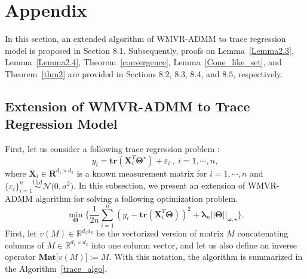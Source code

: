 \documentclass[alpha-refs]{wiley-article}
\begin{document}


\newpage
\section{Appendix}
In this section, an extended algorithm of WMVR-ADMM to trace regression model is proposed in Section 8.1.
Subsequently, proofs on Lemma~\ref{Lemma2.3}, Lemma~\ref{Lemma2.4}, Theorem~\ref{convergence}, Lemma~\ref{Cone_like_set}, and Theorem~\ref{thm2} are provided in Sections $8.2$, $8.3$, $8.4$, and $8.5$, respectively.

\subsection{Extension of WMVR-ADMM to Trace Regression Model} \label{tr_algo}
First, let us consider a following trace regression problem :
\begin{equation*}
    y_{i} = \textbf{tr}(\boldsymbol{X}^{T}_{i}\boldsymbol{\Theta^\star}) + \varepsilon_{i} \ ,\ i = 1, \cdots, n, \label{eq: TR}
\end{equation*}
where $\boldsymbol{X}_{i} \in \boldsymbol{R}^{d_{1} \times d_{2}}$ is a known measurement matrix for $i = 1, \cdots, n$ and $\big\{\varepsilon_{i}\big\}_{i=1}^{n}\stackrel{\text{i.i.d}}{\sim} \mathcal{N}\big( 0, \sigma^{2} \big)$.
In this subsection, we present an extension of WMVR-ADMM algorithm for solving a following optimization problem.
\begin{equation*}
    \min_{\boldsymbol{\Theta}} \Bigg\{ \frac{1}{2n}\sum^{n}_{i=1} (y_{i} - \textbf{tr}(\boldsymbol{X}^{T}_{i}\boldsymbol{\Theta}))^2 + \boldsymbol{\lambda}_{n} ||\boldsymbol{\Theta}||_{\boldsymbol{\omega,\star}} \Bigg\}. \label{eq: opt}
\end{equation*}
First, let $v(M)\in\mathbb{R}^{d_{1}d_{2}}$ be the vectorized version of matrix $M$ concatenating columns of $M\in\mathbb{R}^{d_{1} \times d_{2}}$ into one column vector, and let us also define an inverse operator $\textbf{Mat} \big[ v(M) \big] := M$.
With this notation, the algorithm is summarized in the Algorithm~\ref{trace_algo}.
\end{document}
